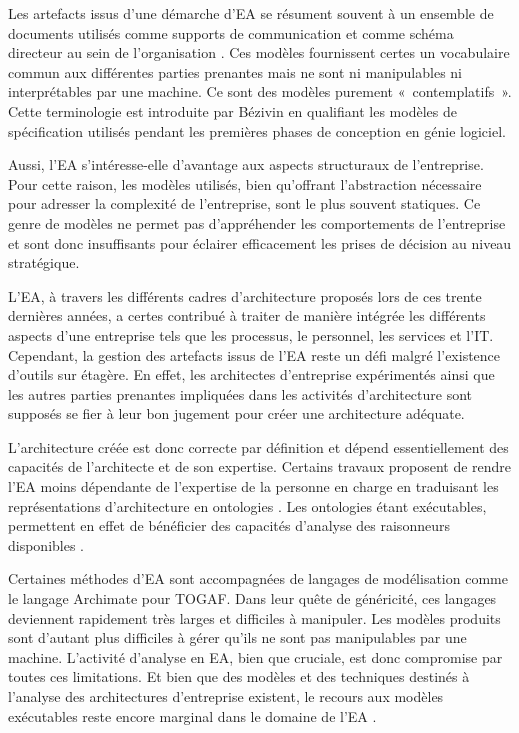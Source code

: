 Les artefacts issus d'une démarche d'EA se résument souvent à un ensemble de
documents utilisés comme supports de communication et comme schéma directeur au
sein de l'organisation \cite{kulkarni_modelling_2013}
\cite{clark_towards_2014}.  Ces modèles fournissent certes un vocabulaire
commun aux différentes parties prenantes mais ne sont	 ni manipulables ni
interprétables par une machine. Ce sont des modèles purement «~contemplatifs~».
Cette terminologie est introduite par Bézivin \cite{bezivin_towards_2001} en qualifiant les modèles de spécification utilisés pendant les premières phases de conception en génie
logiciel. 

Aussi, l'EA s'intéresse-elle d'avantage aux aspects structuraux de
l'entreprise. Pour cette raison, les modèles utilisés, bien qu'offrant
l'abstraction nécessaire pour adresser la complexité de l'entreprise, sont le
plus souvent statiques. Ce genre de modèles ne permet pas d'appréhender les
comportements de l'entreprise et sont donc insuffisants pour éclairer
efficacement les prises de décision au niveau stratégique.

L'EA, à travers les différents cadres d'architecture proposés lors de ces trente
dernières années, a certes contribué à traiter de manière intégrée les
différents aspects d'une entreprise tels que les processus, le personnel, les
services et l'IT. Cependant, la gestion des artefacts issus de l'EA reste un
défi malgré l'existence d'outils sur étagère. En effet, les architectes d'entreprise expérimentés ainsi que les autres parties prenantes impliquées dans les activités
d'architecture sont supposés se fier à leur bon jugement pour créer une
architecture adéquate. 

L'architecture créée est donc correcte par définition et dépend essentiellement
des capacités de l'architecte et de son expertise. Certains travaux proposent de
rendre l'EA moins dépendante de l'expertise de la personne en charge en traduisant les représentations d'architecture en ontologies \cite{sunkle_analyzing_2013}. Les ontologies étant exécutables, permettent en effet de bénéficier des capacités d'analyse des raisonneurs disponibles .

Certaines méthodes d'EA sont accompagnées de langages de modélisation comme le langage Archimate pour TOGAF. Dans leur quête de généricité, ces langages deviennent rapidement
très larges et difficiles à manipuler. Les modèles produits sont d'autant plus
difficiles à gérer qu'ils ne sont pas manipulables par une machine. L'activité
d'analyse en EA, bien que cruciale, est donc compromise par toutes ces
limitations. Et bien que des modèles et des techniques destinés à l'analyse des
architectures d'entreprise existent, le recours aux modèles exécutables
reste encore marginal dans le domaine de l'EA \cite{kulkarni2013modelling}.

